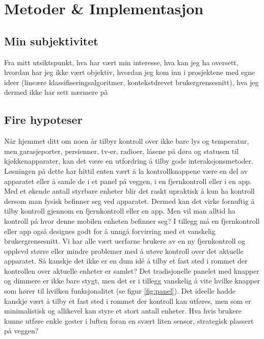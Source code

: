 \section[Metoder \& Implementasjon]{Metoder \& Implementasjon}
\subsection{Min subjektivitet}
{\color{red}Fra mitt utsiktspunkt, hva har vært min interesse, hva kan jeg ha oversett, hvordan har jeg ikke vært objektiv, hvordan jeg kom inn i prosjektene med egne ideer (lineære klassifiseringsalgoritmer, kontekstdrevet brukergrensesnitt), hva jeg dermed ikke har sett nærmere på}

\subsection{Fire hypoteser}
Når hjemmet ditt om noen år tilbyr kontroll over ikke bare lys og temperatur, men garasjeporter, persienner, tv-er, radioer, låsene på døra og statusen til kjøkkenapparater, kan det være en utfordring å tilby gode interaksjonsmetoder. Løsningen på dette har hittil enten vært å la kontrollknappene være en del av apparatet eller å samle de i et panel på veggen, i en fjernkontroll eller i en app. Med et økende antall styrbare enheter blir det raskt upraktisk å kun ha kontroll dersom man fysisk befinner seg ved apparatet. Dermed kan det virke fornuftig å tilby kontroll gjennom en fjernkontroll eller en app. Men vil man alltid ha kontroll på hvor denne mobilen enheten befinner seg? I tillegg må en fjernkontroll eller app også designes godt for å unngå forvirring med et vanskelig brukergrensesnitt. Vi har alle vært uerfarne brukere av en ny fjernkontroll og opplevd større eller mindre problemer med å utøve kontroll over det aktuelle apparatet. Så kanskje det ikke er en dum idé å tilby et fast sted i rommet der kontrollen over aktuelle enheter er samlet? Det tradisjonelle panelet med knapper og dimmere er ikke bare stygt, men det er i tillegg vanskelig å vite hvilke knapper som hører til hvilken funksjonalitet (se figur \ref{fig:panel}). Det ideelle hadde kanskje vært å tilby et fast sted i rommet der kontroll kan utføres, men som er minimalistisk og allikevel kan styre et stort antall enheter. Hva hvis brukere kunne utføre enkle gester i luften foran en svært liten sensor, strategisk plassert på veggen?

